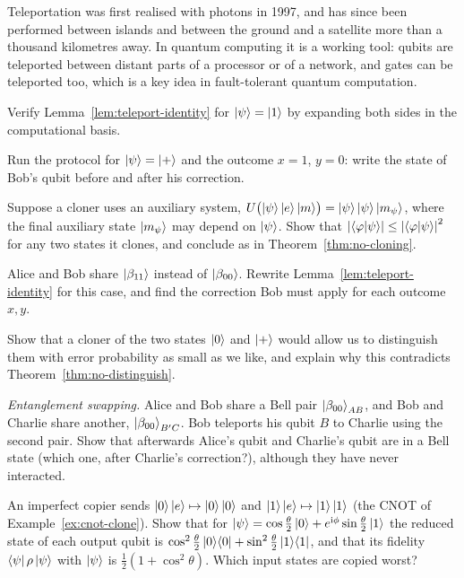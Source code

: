 \begin{lookahead}
  Teleportation was first realised with photons in 1997, and has since been performed between islands and between the ground and a satellite more than a thousand kilometres away. In quantum computing it is a working tool: qubits are teleported between distant parts of a processor or of a network, and gates can be teleported too, which is a key idea in fault-tolerant quantum computation.
\end{lookahead}

\begin{exerciseset}
   Verify Lemma~\ref{lem:teleport-identity} for $\left|\psi\right\rangle=\left|1\right\rangle$ by expanding both sides in the computational basis.

   Run the protocol for $\left|\psi\right\rangle=\left|+\right\rangle$ and the outcome $x=1$, $y=0$: write the state of Bob's qubit before and after his correction.

  \label{ex:clone-ancilla} Suppose a cloner uses an auxiliary system, $U\bigl(\left|\psi\right\rangle\left|e\right\rangle\left|m\right\rangle\bigr)=\left|\psi\right\rangle\left|\psi\right\rangle\left|m_\psi\right\rangle$, where the final auxiliary state $\left|m_\psi\right\rangle$ may depend on $\left|\psi\right\rangle$. Show that $\left|\left\langle\varphi\middle|\psi\right\rangle\right|\le\left|\left\langle\varphi\middle|\psi\right\rangle\right|^2$ for any two states it clones, and conclude as in Theorem~\ref{thm:no-cloning}.

   Alice and Bob share $\left|\beta_{11}\right\rangle$ instead of $\left|\beta_{00}\right\rangle$. Rewrite Lemma~\ref{lem:teleport-identity} for this case, and find the correction Bob must apply for each outcome $x,y$.

   Show that a cloner of the two states $\left|0\right\rangle$ and $\left|+\right\rangle$ would allow us to distinguish them with error probability as small as we like, and explain why this contradicts Theorem~\ref{thm:no-distinguish}.

   \emph{Entanglement swapping.} Alice and Bob share a Bell pair $\left|\beta_{00}\right\rangle_{AB}$, and Bob and Charlie share another, $\left|\beta_{00}\right\rangle_{B'C}$. Bob teleports his qubit $B$ to Charlie using the second pair. Show that afterwards Alice's qubit and Charlie's qubit are in a Bell state (which one, after Charlie's correction?), although they have never interacted.

   An imperfect copier sends $\left|0\right\rangle\left|e\right\rangle\mapsto\left|0\right\rangle\left|0\right\rangle$ and $\left|1\right\rangle\left|e\right\rangle\mapsto\left|1\right\rangle\left|1\right\rangle$ (the CNOT of Example~\ref{ex:cnot-clone}). Show that for $\left|\psi\right\rangle=\cos\tfrac\theta2\left|0\right\rangle+e^{\mathrm{i}\phi}\sin\tfrac\theta2\left|1\right\rangle$ the reduced state of each output qubit is $\cos^2\tfrac\theta2\left|0\right\rangle\!\left\langle0\right|+\sin^2\tfrac\theta2\left|1\right\rangle\!\left\langle1\right|$, and that its fidelity $\left\langle\psi\right|\rho\left|\psi\right\rangle$ with $\left|\psi\right\rangle$ is $\tfrac12(1+\cos^2\theta)$. Which input states are copied worst?
\end{exerciseset}
